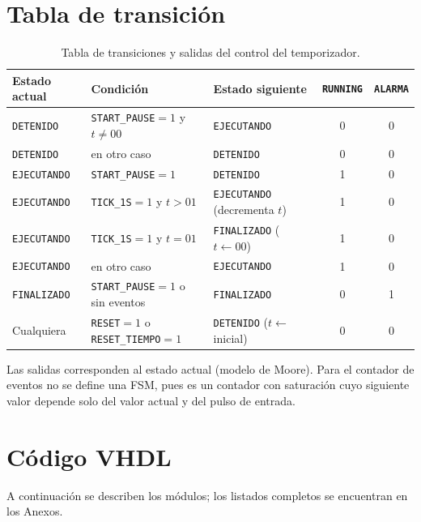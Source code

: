 \documentclass[letterpaper,12pt]{article}
\begin{document}
\section{Tabla de transición}
\begin{table}[H]
\centering
\caption{Tabla de transiciones y salidas del control del temporizador.}
\label{tab:fsm_transiciones}
\small
\begin{tabularx}{\textwidth}{|l|X|l|c|c|}
\hline
\textbf{Estado actual} & \textbf{Condición} & \textbf{Estado siguiente} & \texttt{RUNNING} & \texttt{ALARMA} \\ \hline
\texttt{DETENIDO}   & \texttt{START\_PAUSE}$=1$ y $t\neq00$ & \texttt{EJECUTANDO} & 0 & 0 \\ \hline
\texttt{DETENIDO}   & en otro caso                           & \texttt{DETENIDO}   & 0 & 0 \\ \hline
\texttt{EJECUTANDO} & \texttt{START\_PAUSE}$=1$              & \texttt{DETENIDO}   & 1 & 0 \\ \hline
\texttt{EJECUTANDO} & \texttt{TICK\_1S}$=1$ y $t>01$         & \texttt{EJECUTANDO} (decrementa $t$) & 1 & 0 \\ \hline
\texttt{EJECUTANDO} & \texttt{TICK\_1S}$=1$ y $t=01$         & \texttt{FINALIZADO} ($t\leftarrow00$) & 1 & 0 \\ \hline
\texttt{EJECUTANDO} & en otro caso                           & \texttt{EJECUTANDO} & 1 & 0 \\ \hline
\texttt{FINALIZADO} & \texttt{START\_PAUSE}$=1$ o sin eventos & \texttt{FINALIZADO} & 0 & 1 \\ \hline
Cualquiera          & \texttt{RESET}$=1$ o \texttt{RESET\_TIEMPO}$=1$ & \texttt{DETENIDO} ($t\leftarrow$ inicial) & 0 & 0 \\ \hline
\end{tabularx}
\end{table}
Las salidas corresponden al estado actual (modelo de Moore). Para el contador de eventos no se define una FSM, pues es un contador con saturación cuyo siguiente valor depende solo del valor actual y del pulso de entrada.

\section{Código VHDL}
A continuación se describen los módulos; los listados completos se encuentran en los Anexos.
\end{document}
